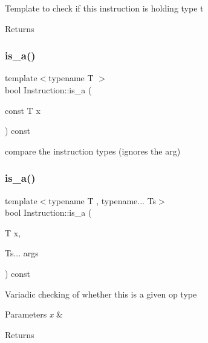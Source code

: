 Template to check if this instruction is holding type t \begin{DoxyReturn}{Returns}

\end{DoxyReturn}
\mbox{\label{class_instruction_a924203cd9a0516d64556ecbf6a79df8a}} 
\subsubsection{\texorpdfstring{is\+\_\+a()}{is\_a()}\hspace{0.1cm}{\footnotesize\ttfamily [1/2]}}
{\footnotesize\ttfamily template$<$typename T $>$ \\
bool Instruction\+::is\+\_\+a (\begin{DoxyParamCaption}\item[{const T}]{x }\end{DoxyParamCaption}) const\hspace{0.3cm}{\ttfamily [inline]}}



compare the instruction types (ignores the arg) 

\mbox{\label{class_instruction_ae670ee58f9acdfd60b7213f77dfca794}} 
\subsubsection{\texorpdfstring{is\+\_\+a()}{is\_a()}\hspace{0.1cm}{\footnotesize\ttfamily [2/2]}}
{\footnotesize\ttfamily template$<$typename T , typename... Ts$>$ \\
bool Instruction\+::is\+\_\+a (\begin{DoxyParamCaption}\item[{T}]{x,  }\item[{Ts...}]{args }\end{DoxyParamCaption}) const\hspace{0.3cm}{\ttfamily [inline]}}

Variadic checking of whether this is a given op type 
\begin{DoxyParams}{Parameters}
{\em x} & \\
\hline
\end{DoxyParams}
\begin{DoxyReturn}{Returns}

\end{DoxyReturn}
\mbox{\label{class_instruction_a75e0ecee9ec917bcc47488a1fbeb6a24}} 
